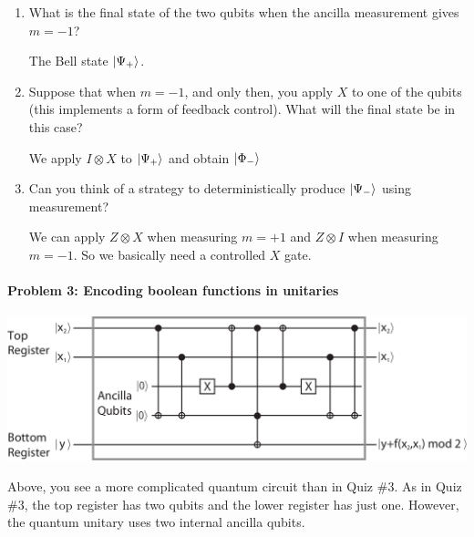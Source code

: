 \documentclass[12pt]{article}
\newenvironment{answer}{\begingroup\setlength{\leftskip}{-\leftmargin}\begin{framed}}{\end{framed}\endgroup}
\begin{document}
\begin{enumerate}
    \item What is the final state of the two qubits when the ancilla measurement gives $m = -1$?

    \begin{answer}
        The Bell state $\ket{\Psi_+}$.
    \end{answer}

    \item Suppose that when $m = -1$, and only then, you apply $X$ to one of the qubits (this implements a form of feedback control). What will the final state be in this case?

    \begin{answer}
    	We apply $I \otimes X$ to $\ket{\Psi_+}$ and obtain $\ket{\Phi_-}$
    \end{answer}

    \item Can you think of a strategy to deterministically produce $\ket{\Psi_-}$ using measurement?

    \begin{answer}
    	We can apply $Z \otimes X$ when measuring $m = +1$ and $Z \otimes I$ when measuring $m = -1$. So we basically need a controlled $X$ gate.
    \end{answer}
\end{enumerate}

\paragraph{Problem 3: Encoding boolean functions in unitaries}

\begin{center}\includegraphics[width=.6\textwidth]{problem-3.png}\end{center}

Above, you see a more complicated quantum circuit than in Quiz \#3. As in Quiz \#3, the top register has two qubits and the lower register has just one. However, the quantum unitary uses two internal ancilla qubits.
\end{document}
